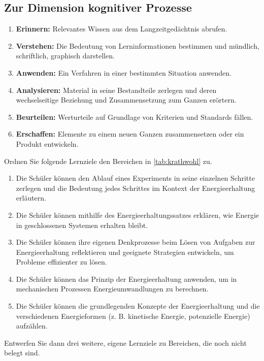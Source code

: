\subsection{Zur Dimension kognitiver Prozesse}
\begin{enumerate}
	\item \textbf{Erinnern:} Relevantes Wissen aus dem Langzeitgedächtnis abrufen.
	\item \textbf{Verstehen:} Die Bedeutung von Lerninformationen bestimmen und mündlich, schriftlich, graphisch darstellen.
	\item \textbf{Anwenden:} Ein Verfahren in einer bestimmten Situation anwenden.
	\item \textbf{Analysieren:} Material in seine Bestandteile zerlegen und deren wechselseitige Beziehung und Zusammensetzung zum Ganzen erörtern.
	\item \textbf{Beurteilen:} Werturteile auf Grundlage von Kriterien und Standards fällen.
	\item \textbf{Erschaffen:} Elemente zu einem neuen Ganzen zusammensetzen oder ein Produkt entwickeln.
\end{enumerate}

\begin{uea}
	Ordnen Sie folgende Lernziele den Bereichen in \cref{tab:krathwohl} zu.
	\begin{enumerate}[label=\alph*.]
		\item Die Schüler können den Ablauf eines Experiments in seine einzelnen Schritte zerlegen und die Bedeutung jedes Schrittes im Kontext der Energieerhaltung erläutern.
		\item Die Schüler können mithilfe des Energieerhaltungssatzes erklären, wie Energie in geschlossenen Systemen erhalten bleibt.
		\item Die Schüler können ihre eigenen Denkprozesse beim Lösen von Aufgaben zur Energieerhaltung reflektieren und geeignete Strategien entwickeln, um Probleme effizienter zu lösen.
		\item Die Schüler können das Prinzip der Energieerhaltung anwenden, um in mechanischen Prozessen Energieumwandlungen zu berechnen.
		\item Die Schüler können die grundlegenden Konzepte der Energieerhaltung und die verschiedenen Energieformen (z. B. kinetische Energie, potenzielle Energie) aufzählen.
	\end{enumerate}
	Entwerfen Sie dann drei weitere, eigene Lernziele zu Bereichen, die noch nicht belegt sind.
	
	\flushright{}
\end{uea}

